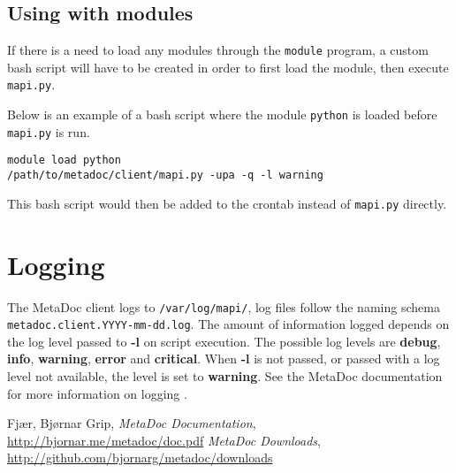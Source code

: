 \documentclass[titlepage, a4paper,10pt]{article}
\begin{document}
\subsection{Using with modules}
If there is a need to load any modules through the \texttt{module} program,
a custom bash script will have to be created in order to first load the module,
then execute \texttt{mapi.py}. 

Below is an example of a bash script where the module \texttt{python} is loaded
before \texttt{mapi.py} is run.

\begin{verbatim}
module load python
/path/to/metadoc/client/mapi.py -upa -q -l warning
\end{verbatim}

This bash script would then be added to the crontab instead of \texttt{mapi.py}
directly.

\section{Logging}
The MetaDoc client logs to \texttt{/var/log/mapi/}, log files follow the naming
schema \texttt{metadoc.client.YYYY-mm-dd.log}. The amount of information logged
depends on the log level passed to \textbf{-l} on script execution. The
possible log levels are \textbf{debug}, \textbf{info}, \textbf{warning},
\textbf{error} and \textbf{critical}. When \textbf{-l} is not passed, or passed
with a log level not available, the level is set to \textbf{warning}. See the
MetaDoc documentation for more information on logging \cite{mdoc}.

\newpage
\begin{thebibliography}{99}
     Fjær, Bjørnar Grip, \textit{MetaDoc Documentation},
        \url{http://bjornar.me/metadoc/doc.pdf}
     \textit{MetaDoc Downloads},
        \url{http://github.com/bjornarg/metadoc/downloads}
\end{thebibliography}
\end{document}
